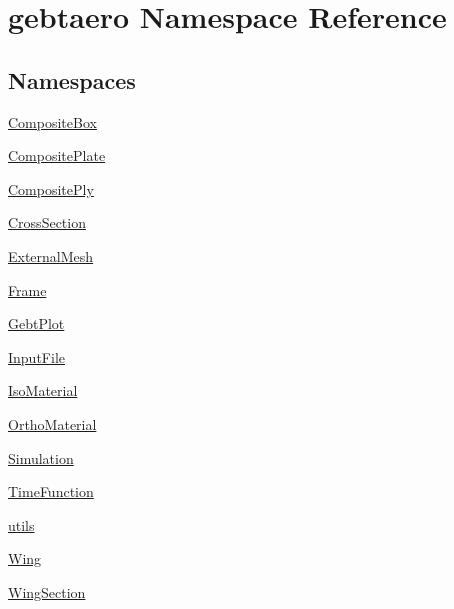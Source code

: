 \hypertarget{namespacegebtaero}{}\section{gebtaero Namespace Reference}
\label{namespacegebtaero}
\subsection*{Namespaces}
\begin{DoxyCompactItemize}
\item 
 \hyperlink{namespacegebtaero_1_1_composite_box}{Composite\+Box}
\item 
 \hyperlink{namespacegebtaero_1_1_composite_plate}{Composite\+Plate}
\item 
 \hyperlink{namespacegebtaero_1_1_composite_ply}{Composite\+Ply}
\item 
 \hyperlink{namespacegebtaero_1_1_cross_section}{Cross\+Section}
\item 
 \hyperlink{namespacegebtaero_1_1_external_mesh}{External\+Mesh}
\item 
 \hyperlink{namespacegebtaero_1_1_frame}{Frame}
\item 
 \hyperlink{namespacegebtaero_1_1_gebt_plot}{Gebt\+Plot}
\item 
 \hyperlink{namespacegebtaero_1_1_input_file}{Input\+File}
\item 
 \hyperlink{namespacegebtaero_1_1_iso_material}{Iso\+Material}
\item 
 \hyperlink{namespacegebtaero_1_1_ortho_material}{Ortho\+Material}
\item 
 \hyperlink{namespacegebtaero_1_1_simulation}{Simulation}
\item 
 \hyperlink{namespacegebtaero_1_1_time_function}{Time\+Function}
\item 
 \hyperlink{namespacegebtaero_1_1utils}{utils}
\item 
 \hyperlink{namespacegebtaero_1_1_wing}{Wing}
\item 
 \hyperlink{namespacegebtaero_1_1_wing_section}{Wing\+Section}
\end{DoxyCompactItemize}
